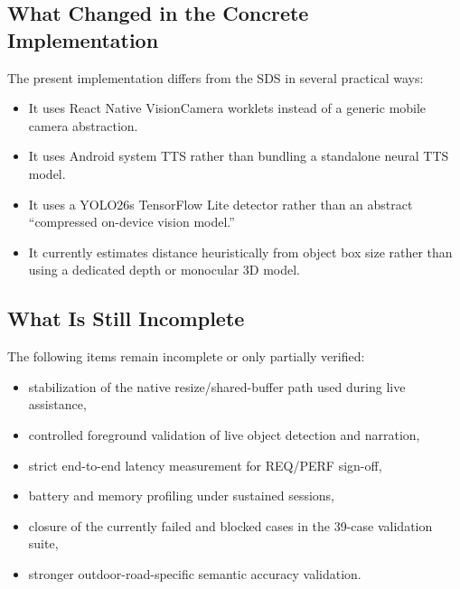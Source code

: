 \documentclass[conference]{IEEEtran}
\begin{document}
\subsection{What Changed in the Concrete Implementation}
The present implementation differs from the SDS in several practical ways:
\begin{itemize}[leftmargin=1.2em]
\item It uses React Native VisionCamera worklets instead of a generic mobile camera abstraction.
\item It uses Android system TTS rather than bundling a standalone neural TTS model.
\item It uses a YOLO26s TensorFlow Lite detector rather than an abstract ``compressed on-device vision model.''
\item It currently estimates distance heuristically from object box size rather than using a dedicated depth or monocular 3D model.
\end{itemize}

\subsection{What Is Still Incomplete}
The following items remain incomplete or only partially verified:
\begin{itemize}[leftmargin=1.2em]
\item stabilization of the native resize/shared-buffer path used during live assistance,
\item controlled foreground validation of live object detection and narration,
\item strict end-to-end latency measurement for REQ/PERF sign-off,
\item battery and memory profiling under sustained sessions,
\item closure of the currently failed and blocked cases in the 39-case validation suite,
\item stronger outdoor-road-specific semantic accuracy validation.
\end{itemize}
\end{document}
